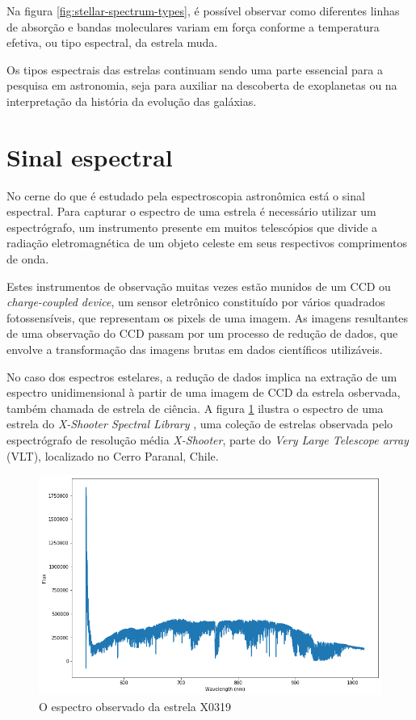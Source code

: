 Na figura \ref{fig:stellar-spectrum-types}, é possível observar como diferentes linhas de absorção e bandas moleculares variam em força conforme a temperatura efetiva, ou tipo espectral, da estrela muda.

Os tipos espectrais das estrelas continuam sendo uma parte essencial para a pesquisa em astronomia, seja para auxiliar na descoberta de exoplanetas ou na interpretação da história da evolução das galáxias. 

\section{Sinal espectral}

No cerne do que é estudado pela espectroscopia astronômica está o sinal espectral. Para capturar o espectro de uma estrela é necessário utilizar um espectrógrafo, um instrumento presente em muitos telescópios que divide a radiação eletromagnética de um objeto celeste em seus respectivos comprimentos de onda.

Estes instrumentos de observação muitas vezes estão munidos de um CCD ou \textit{charge-coupled device}, um sensor eletrônico constituído por vários quadrados fotossensíveis, que representam os pixels de uma imagem. As imagens resultantes de uma observação do CCD passam por um processo de redução de dados, que envolve a transformação das imagens brutas em dados científicos utilizáveis.   

No caso dos espectros estelares, a redução de dados implica na extração de um espectro unidimensional à partir de uma imagem de CCD da estrela osbervada, também chamada de estrela de ciência. A figura \ref{fig:x0319-obs-spectrum} ilustra o espectro de uma estrela do \textit{X-Shooter Spectral Library} \citep{Chen2014TheXS}, uma coleção de estrelas observada pelo espectrógrafo de resolução média \textit{X-Shooter}, parte do \textit{Very Large Telescope array} (VLT), localizado no Cerro Paranal, Chile.  

\begin{figure}[htb]
\centering
\includegraphics[width=15cm]{figuras/X0319_obs_spectrum.png}
\caption{O espectro observado da estrela X0319}
\label{fig:x0319-obs-spectrum}
\end{figure}

